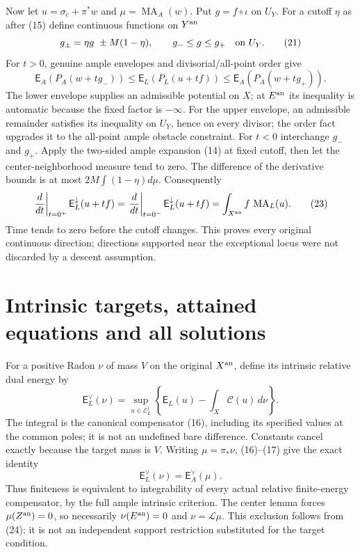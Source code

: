 \documentclass[11pt]{article}
\newcommand{\MA}{\operatorname{MA}}
\begin{document}
Now let $u=\sigma_c+\pi^*w$ and $\mu=\MA_A(w)$. Put
$g=f\circ\iota$ on $U_Y$. For a cutoff $\eta$ as after (15)
define continuous functions on $Y^{\rm an}$
\[
 g_\pm=\eta g\ \pm M(1-\eta),\qquad
          g_-\leq g\leq g_+\quad\hbox{on }U_Y.            \tag{21}
\]
For $t>0$, genuine ample envelopes and divisorial/all-point order
give
\[
 \mathsf E_A(P_A(w+t g_-))
 \leq\mathsf E_L(P_L(u+tf))
 \leq\mathsf E_A(P_A(w+t g_+)).                            \tag{22}
\]
The lower envelope supplies an admissible potential on $X$;
at $E^{\rm an}$ its inequality is automatic because the fixed
factor is $-\infty$. For the upper envelope, an admissible
remainder satisfies its inequality on $U_Y$, hence on every
divisor; the order fact upgrades it to the all-point ample
obstacle constraint. For $t<0$ interchange $g_-$ and $g_+$.
Apply the two-sided ample expansion (14) at fixed cutoff, then
let the center-neighborhood measure tend to zero. The difference
of the derivative bounds is at most $2M\int(1-\eta)d\mu$.
Consequently
\[
 \left.\frac{d}{dt}\right|_{t=0^+}\mathsf E_L^\downarrow(u+tf)
 =\left.\frac{d}{dt}\right|_{t=0^-}\mathsf E_L^\downarrow(u+tf)
 =\int_{X^{\rm an}}f\,\MA_L(u).                          \tag{23}
\]
Time tends to zero before the cutoff changes. This proves every
original continuous direction; directions supported near the
exceptional locus were not discarded by a descent assumption.

\section{Intrinsic targets, attained equations and all solutions}
For a positive Radon $\nu$ of mass $V$ on the original $X^{\rm an}$,
define its intrinsic relative dual energy by
\[
 \mathsf E_L^\vee(\nu)=
 \sup_{u\in\mathcal E_L^1}
       \left\{\mathsf E_L(u)-\int_X\mathcal C(u)\,d\nu\right\}.
                                                               \tag{24}
\]
The integral is the canonical compensator (16), including its
specified values at the common poles; it is not an undefined bare
difference. Constants cancel exactly because the target mass is $V$.
Writing $\mu=\pi_*\nu$, (16)--(17) give the exact identity
\[
                        \mathsf E_L^\vee(\nu)
                              =\mathsf E_A^\vee(\mu).     \tag{25}
\]
Thus finiteness is equivalent to integrability of every actual
relative finite-energy compensator, by the full ample intrinsic
criterion. The center lemma forces $\mu(Z^{\rm an})=0$,
so necessarily $\nu(E^{\rm an})=0$ and $\nu=\mathcal L\mu$.
This exclusion follows from (24); it is not an independent support
restriction substituted for the target condition.
\end{document}
